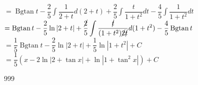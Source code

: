 \documentclass[a4paper]{article}
\begin{document}
$=\operatorname{Bgtan}t - \dfrac{2}{5} \displaystyle\int \dfrac{1}{2+t} d(2+t) +\dfrac{2}{5} \displaystyle\int \dfrac{t}{1+t^2} dt - \dfrac{4}{5} \displaystyle\int \dfrac{1}{1+t^2} dt$\\

$=\operatorname{Bgtan}t - \dfrac{2}{5} \ln |2+t|  + \dfrac{\cancel{2}}{5} \displaystyle\int \dfrac{\cancel{t}}{(1+t^2)\cancel{2}\cancel{t}} d(1+t^2) - \dfrac{4}{5}  \operatorname{Bgtan} t $\\ 

$=\dfrac{1}{5} \operatorname{Bgtan} t -\dfrac{2}{5} \ln |2+t| + \dfrac{1}{5} \ln | 1+t^2| +C$\\

$= \dfrac{1}{5} \left(x - 2 \ln|2+ \tan x| +  \ln | 1+ \tan^2 x| \right)+ C $ \\


			




\begin{thebibliography}{999}
\end{thebibliography}
\end{document}
